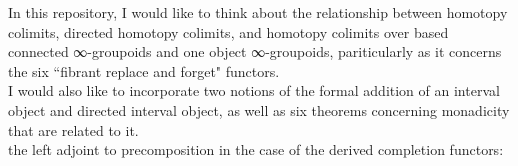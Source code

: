 \documentclass{book}
\theoremstyle{definition}
\begin{document}
{In this repository, I would like to think about the relationship between homotopy colimits, directed homotopy colimits, and homotopy colimits over based connected ∞-groupoids and one object ∞-groupoids, pariticularly as it concerns the six ``fibrant replace and forget" functors.\\

I would also like to incorporate two notions of the formal addition of an interval object and directed interval object, as well as six theorems concerning monadicity that are related to it.\\

 the left adjoint to precomposition in the case of the derived completion functors:

}
\end{document}
